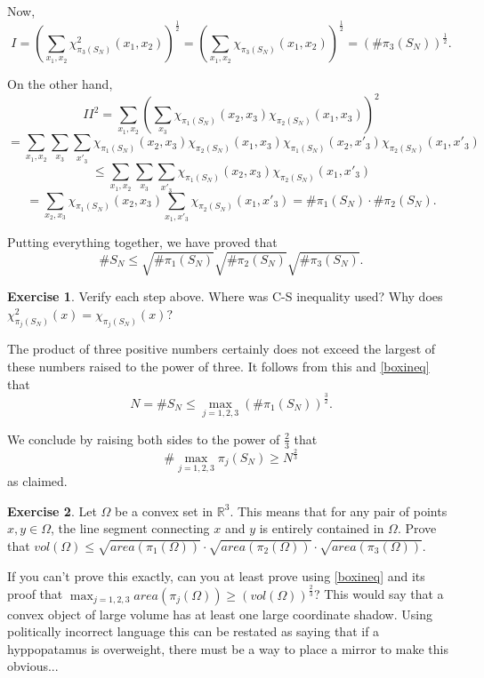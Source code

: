\documentclass[]{stml-l}
\numberwithin{equation}{chapter}
\theoremstyle{plain}
\theoremstyle{definition}
\newtheorem{exercise}{Exercise}[chapter]
\theoremstyle{remark}
\begin{document}
Now,
$$ I={\left(\sum_{x_1,x_2}
\chi^2_{\pi_3(S_N)}(x_1,x_2)\right)}^{\frac{1}{2}}={\left(\sum_{x_1,x_2}
\chi_{\pi_3(S_N)}(x_1,x_2)\right)}^{\frac{1}{2}}={(\#
\pi_3(S_N))}^{\frac{1}{2}}. $$

On the other hand,
$$ {II}^2=\sum_{x_1,x_2} {\left(\sum_{x_3}
\chi_{\pi_1(S_N)}(x_2,x_3)\chi_{\pi_2(S_N)}(x_1,x_3)\right)}^2$$
$$=\sum_{x_1,x_2} \sum_{x_3} \sum_{x'_3}
\chi_{\pi_1(S_N)}(x_2,x_3)\chi_{\pi_2(S_N)}(x_1,x_3)
\chi_{\pi_1(S_N)}(x_2,x'_3)\chi_{\pi_2(S_N)}(x_1,x'_3)$$
$$ \leq \sum_{x_1,x_2} \sum_{x_3} \sum_{x'_3}
\chi_{\pi_1(S_N)}(x_2,x_3)\chi_{\pi_2(S_N)}(x_1,x'_3)$$
$$=\sum_{x_2,x_3}\chi_{\pi_1(S_N)}(x_2,x_3)
\sum_{x_1,x'_3}\chi_{\pi_2(S_N)}(x_1,x'_3)=\# \pi_1(S_N) \cdot \#
\pi_2(S_N). $$

Putting everything together, we have proved that
\begin{equation} \label{boxineq} \# S_N \leq \sqrt{\# \pi_1(S_N)}\sqrt{\# \pi_2(S_N)}\sqrt{\#
\pi_3(S_N)}. \end{equation}

\begin{exercise} Verify each step above. Where was C-S inequality
used? Why does $\chi^2_{\pi_j(S_N)}(x)=\chi_{\pi_j(S_N)}(x)$? \end{exercise}

The product of three positive numbers certainly does not exceed the
largest of these numbers raised to the power of three. It follows from
this and \ref{boxineq} that
$$ N=\# S_N \leq \max_{j=1,2,3} {(\# \pi_1(S_N))}^{\frac{3}{2}}. $$

We conclude by raising both sides to the power of $\frac{2}{3}$ that
$$ \# \max_{j=1,2,3} \pi_j(S_N) \ge N^{\frac{2}{3}} $$ as
claimed.

\begin{exercise} Let $\Omega$ be a convex set in ${\mathbb R}^3$.
This means that for any pair of points $x,y \in \Omega$, the line segment
connecting $x$ and $y$ is entirely contained in $\Omega$. Prove that
$vol(\Omega) \leq \sqrt{area(\pi_1(\Omega))} \cdot
\sqrt{area(\pi_2(\Omega))} \cdot \sqrt{area(\pi_3(\Omega))}$. \end{exercise} 

If you can't prove this exactly, can you at least prove using \ref{boxineq}
and its proof that $\max_{j=1,2,3} area(\pi_j(\Omega)) \ge
{(vol(\Omega))}^{\frac{2}{3}}$? This would say that a convex object of
large volume has at least one large coordinate shadow. Using politically
incorrect language this can be restated as saying that if a hyppopatamus
is overweight, there must be a way to place a mirror to make this
obvious... 
\end{document}
